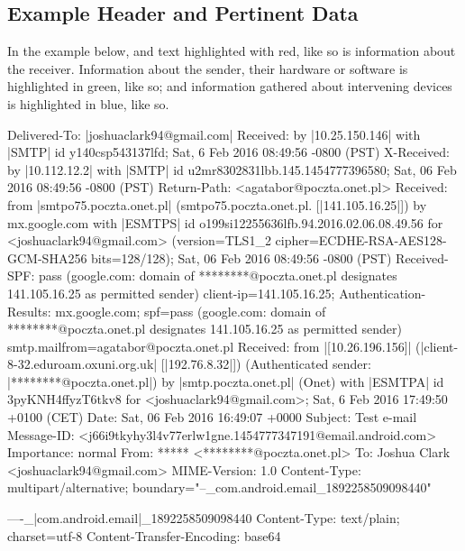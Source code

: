\subsection{Example Header and Pertinent Data}

In the example below, and text highlighted with red, \colorbox{red!30}{like so}
is information about the receiver.  Information about the sender, their
hardware or software is highlighted in green, \colorbox{green!30}{like so}; and
information gathered about intervening devices is highlighted in blue,
\colorbox{blue!30}{like so}.

\begin{example}[caption=Sample E-Mail]
Delivered-To: |\colorbox{red!30}{joshuaclark94@gmail.com}|
Received: by |\colorbox{blue!30}{10.25.150.146}| with |\colorbox{blue!30}{SMTP}| id y140csp543137lfd;
	Sat, 6 Feb 2016 08:49:56 -0800 (PST)
X-Received: by |\colorbox{blue!30}{10.112.12.2}| with |\colorbox{blue!30}{SMTP}| id u2mr8302831lbb.145.1454777396580;
	Sat, 06 Feb 2016 08:49:56 -0800 (PST)
Return-Path: <agatabor@poczta.onet.pl>
Received: from |\colorbox{blue!30}{smtpo75.poczta.onet.pl}| (smtpo75.poczta.onet.pl. [|\colorbox{blue!30}{141.105.16.25}|])
	by mx.google.com with |\colorbox{blue!30}{ESMTPS}| id o199si12255636lfb.94.2016.02.06.08.49.56
	for <joshuaclark94@gmail.com>
	(version=TLS1_2 cipher=ECDHE-RSA-AES128-GCM-SHA256 bits=128/128);
	Sat, 06 Feb 2016 08:49:56 -0800 (PST)
Received-SPF: pass (google.com: domain of ********@poczta.onet.pl designates
		141.105.16.25 as permitted sender) client-ip=141.105.16.25;
Authentication-Results: mx.google.com;
spf=pass (google.com: domain of ********@poczta.onet.pl designates 141.105.16.25
		as permitted sender) smtp.mailfrom=agatabor@poczta.onet.pl
Received: from |\colorbox{green!30}{[10.26.196.156]}| (|\colorbox{green!30}{client-8-32.eduroam.oxuni.org.uk}| [|\colorbox{green!30}{192.76.8.32}|])
(Authenticated sender: |\colorbox{green!30}{********@poczta.onet.pl}|)
by |\colorbox{blue!30}{smtp.poczta.onet.pl}| (Onet) with |\colorbox{blue!30}{ESMTPA}| id 3pyKNH4ffyzT6tkv8
for <joshuaclark94@gmail.com>; Sat,  6 Feb 2016 17:49:50 +0100 (CET)
Date: Sat, 06 Feb 2016 16:49:07 +0000
Subject: Test e-mail
Message-ID: <j66i9tkyhy3l4v77erlw1gne.1454777347191@email.android.com>
Importance: normal
From: ***** <********@poczta.onet.pl>
To: Joshua Clark <joshuaclark94@gmail.com>
MIME-Version: 1.0
Content-Type: multipart/alternative;
	boundary="--_com.android.email_1892258509098440"

----_|\colorbox{green!30}{com.android.email}|_1892258509098440
Content-Type: text/plain; charset=utf-8
Content-Transfer-Encoding: base64


\end{example}
